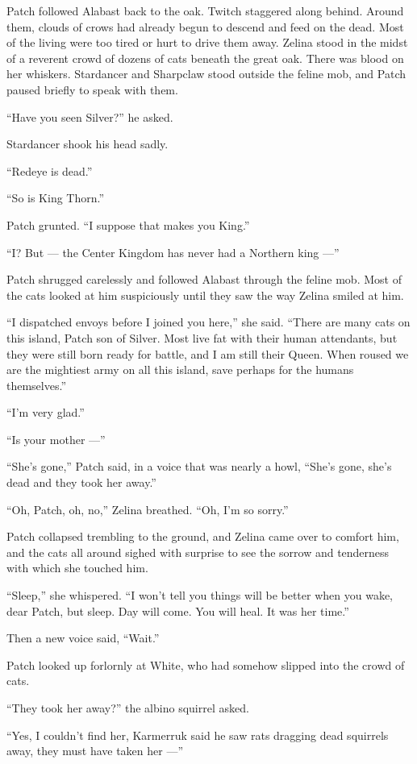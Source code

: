 \documentclass[ebook,oneside,openany,17pt]{memoir}
\begin{document}
Patch followed Alabast back to the oak. Twitch staggered along
behind. Around them, clouds of crows had already begun to descend and
feed on the dead. Most of the living were too tired or hurt to drive
them away. Zelina stood in the midst of a reverent crowd of dozens of
cats beneath the great oak. There was blood on her
whiskers. Stardancer and Sharpclaw stood outside the feline mob, and
Patch paused briefly to speak with them.

“Have you seen Silver?” he asked.

Stardancer shook his head sadly.

“Redeye is dead.”

“So is King Thorn.”

Patch grunted. “I suppose that makes you King.”

“I? But — the Center Kingdom has never had a Northern king —”

Patch shrugged carelessly and followed Alabast through the feline
mob. Most of the cats looked at him suspiciously until they saw the
way Zelina smiled at him.

“I dispatched envoys before I joined you here,” she said. “There are
many cats on this island, Patch son of Silver. Most live fat with
their human attendants, but they were still born ready for battle, and
I am still their Queen. When roused we are the mightiest army on all
this island, save perhaps for the humans themselves.”

“I’m very glad.”

“Is your mother —”

“She’s gone,” Patch said, in a voice that was nearly a howl, “She’s
gone, she’s dead and they took her away.”

“Oh, Patch, oh, no,” Zelina breathed. “Oh, I’m so sorry.”

Patch collapsed trembling to the ground, and Zelina came over to
comfort him, and the cats all around sighed with surprise to see the
sorrow and tenderness with which she touched him.

“Sleep,” she whispered. “I won’t tell you things will be better when
you wake, dear Patch, but sleep. Day will come. You will heal. It was
her time.”

Then a new voice said, “Wait.”

Patch looked up forlornly at White, who had somehow slipped into the
crowd of cats.

“They took her away?” the albino squirrel asked.

“Yes, I couldn’t find her, Karmerruk said he saw rats dragging dead
squirrels away, they must have taken her —”
\end{document}
